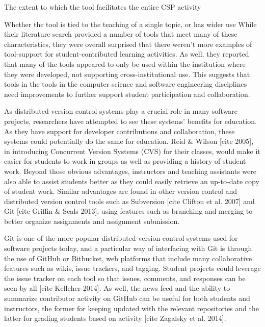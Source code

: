 The extent to which the tool facilitates the entire CSP activity

Whether the tool is tied to the teaching of a single topic, or has wider use
While their literature search provided a number of tools that meet many of these characteristics, they were overall surprised that there weren’t more examples of tool-support for student-contributed learning activities. As well, they reported that many of the tools appeared to only be used within the institution where they were developed, not supporting cross-institutional use. This suggests that tools in the tools in the computer science and software engineering disciplines need improvements to further support student participation and collaboration.

As distributed version control systems play a crucial role in many software projects, researchers have attempted to see these systems’ benefits for education. As they have support for developer contributions and collaboration, these systems could potentially do the same for education. Reid & Wilson [cite 2005], in introducing Concurrent Version Systems (CVS) for their classes, would make it easier for students to work in groups as well as providing a history of student work. Beyond those obvious advantages, instructors and teaching assistants were also able to assist students better as they could easily retrieve an up-to-date copy of student work. Similar advantages are found in other version control and distributed version control tools such as Subversion [cite Clifton et al. 2007] and Git [cite Griffin & Seals 2013], using features such as branching and merging to better organize assignments and assignment submission.

Git is one of the more popular distributed version control systems used for software projects today, and a particular way of interfacing with Git is through the use of GitHub or Bitbucket, web platforms that include many collaborative features such as wikis, issue trackers, and tagging. Student projects could leverage the issue tracker on each tool so that issues, comments, and responses can be seen by all [cite Kelleher 2014]. As well, the news feed and the ability to summarize contributor activity on GitHub can be useful for both students and instructors, the former for keeping updated with the relevant repositories and the latter for grading students based on activity [cite Zagalsky et al. 2014].
